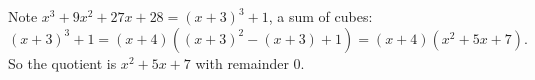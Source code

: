 Note $x^3+9x^2+27x+28=(x+3)^3+1$, a sum of cubes:
\[(x+3)^3+1=(x+4)\left((x+3)^2-(x+3)+1\right)=(x+4)\left(x^2+5x+7\right).\]
So the quotient is $\boxed{x^2+5x+7}$ with remainder $0$.

